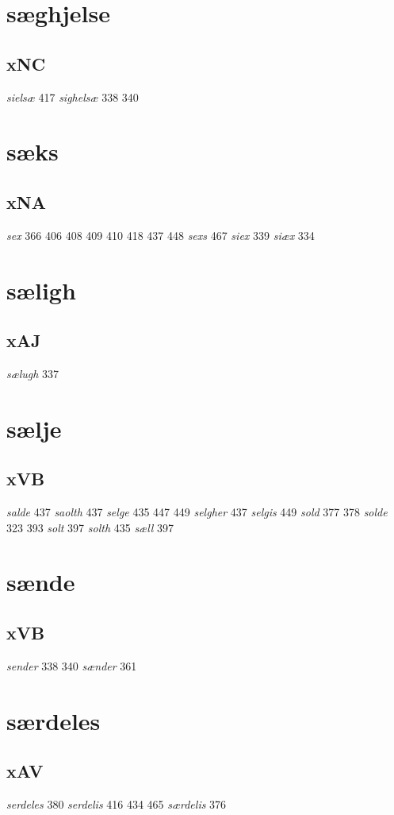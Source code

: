\documentclass[a4paper,twocolumn]{article}
\begin{document}
\section{sæghjelse}
\label{sec:orgf1300ae}
\subsection{xNC}
\label{sec:org07170c2}
\emph{sielsæ} 417 \emph{sighelsæ} 338 340 
\section{sæks}
\label{sec:org42523ae}
\subsection{xNA}
\label{sec:org1873121}
\emph{sex} 366 406 408 409 410 418 437 448 \emph{sexs} 467 \emph{siex} 339 \emph{siæx} 334 
\section{sæligh}
\label{sec:org71c4d2c}
\subsection{xAJ}
\label{sec:org946c39e}
\emph{sælugh} 337 
\section{sælje}
\label{sec:orgaaf47c1}
\subsection{xVB}
\label{sec:orgc41fae0}
\emph{salde} 437 \emph{saolth} 437 \emph{selge} 435 447 449 \emph{selgher} 437 \emph{selgis} 449 \emph{sold} 377 378 \emph{solde} 323 393 \emph{solt} 397 \emph{solth} 435 \emph{sæll} 397 
\section{sænde}
\label{sec:org45a13c1}
\subsection{xVB}
\label{sec:orge8f022b}
\emph{sender} 338 340 \emph{sænder} 361 
\section{særdeles}
\label{sec:org9a364a5}
\subsection{xAV}
\label{sec:orgf4e3642}
\emph{serdeles} 380 \emph{serdelis} 416 434 465 \emph{særdelis} 376 
\end{document}
